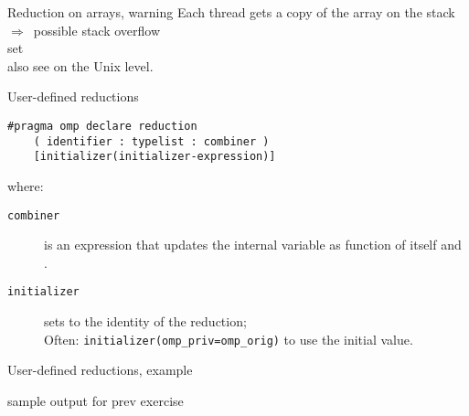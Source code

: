 \begin{numberedframe}{Reduction on arrays, warning}
  Each thread gets a copy of the array on the stack\\
  $\Rightarrow$~possible stack overflow\\
  set \\
  also see  on the Unix level.
\end{numberedframe}

\begin{numberedframe}{User-defined reductions}
  \begin{lstlisting}[language=omp]
    #pragma omp declare reduction 
    ( identifier : typelist : combiner )
    [initializer(initializer-expression)]
  \end{lstlisting}
  where:
  \begin{description}
  \item[\texttt{combiner}] is an expression that updates the internal
    variable  as function of itself and .
  \item[\texttt{initializer}] sets  to the
    identity of the reduction;\\
    Often: \lstinline{initializer(omp_priv=omp_orig)} to use the initial value.
  \end{description}
\end{numberedframe}
\begin{numberedframe}{User-defined reductions, example}
\end{numberedframe}

\begin{exerciseframe}
  
\end{exerciseframe}

\begin{numberedframe}{sample output for prev exercise}
  
\end{numberedframe}

\endinput

\Level 1 {Exercises}

\begin{exerciseframe}[jacobi]
  
\end{exerciseframe}

\begin{exerciseframe}
  
\end{exerciseframe}

\begin{exerciseframe}
  
\end{exerciseframe}

\begin{exerciseframe}
  
\end{exerciseframe}

\endinput

\begin{numberedframe}{}
\begin{lstlisting}
\end{lstlisting}
  \begin{itemize}
  \item 
  \end{itemize}
\end{numberedframe}

